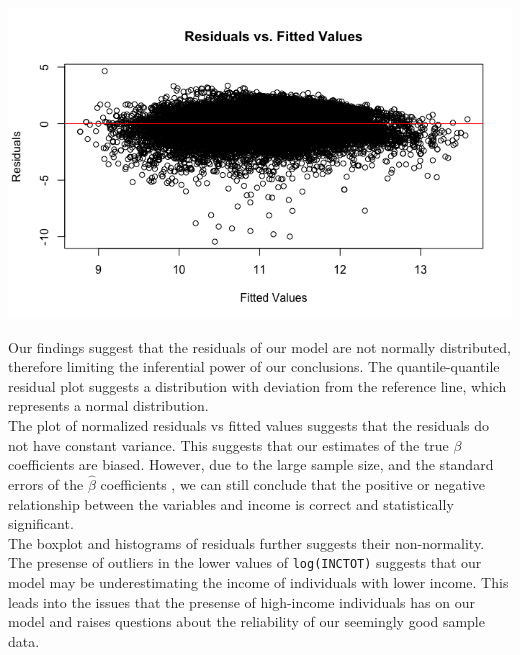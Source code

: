 \documentclass{article}
\newenvironment{custommargins}[2]{%
    \newgeometry{left=#1, right=#2}%
}{%
    \restoregeometry%
}
\begin{document}
\begin{custommargins}{2cm}{2cm}
\begin{minipage}{0.49\textwidth}
\end{minipage}
\begin{minipage}{0.49\textwidth}
    \centering
    \includegraphics[width=\textwidth]{../figures/post/residualvsfitted-k-foldcv.png}
\end{minipage}
\vfill
\end{custommargins}
Our findings suggest that the residuals of our model are not normally distributed, therefore limiting the inferential power of our conclusions.
The quantile-quantile residual plot suggests a distribution with deviation from the reference line, which represents a normal distribution.
\\

The plot of normalized residuals vs fitted values suggests that the residuals do not have constant variance.
This suggests that our estimates of the true $\beta$ coefficients are biased. However, due to the large sample size, and the standard errors of the $\hat{\beta}$ coefficients
, we can still conclude that the positive or negative relationship between the variables and income is correct and statistically significant.
\\

The boxplot and histograms of residuals further suggests their non-normality. The presense of outliers in the lower values of \texttt{log(INCTOT)} suggests that our model may be underestimating the income of individuals with lower income.
This leads into the issues that the presense of high-income individuals has on our model and raises questions about the reliability of our seemingly good sample data.

\end{document}
